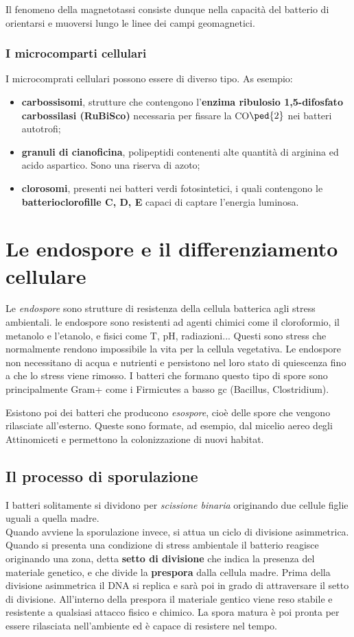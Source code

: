 \documentclass[11pt]{book}
\begin{document}
Il fenomeno della magnetotassi consiste dunque nella capacità del batterio di orientarsi e muoversi lungo le linee dei campi geomagnetici. 


\subsection{I microcomparti cellulari}
I microcomprati cellulari possono essere di diverso tipo. As esempio:
\begin{itemize}
\item \textbf{carbossisomi}, strutture che contengono l’\textbf{enzima ribulosio 1,5-difosfato carbossilasi (RuBiSco)} necessaria per fissare la CO$\ped{2}$ nei batteri autotrofi;
\item \textbf{granuli di cianoficina}, polipeptidi contenenti alte quantità di arginina ed acido aspartico. Sono una riserva di azoto;
\item \textbf{clorosomi}, presenti nei batteri verdi fotosintetici, i quali contengono le \textbf{batterioclorofille C, D, E} capaci di captare l’energia luminosa.
\end{itemize}

\clearpage
\chapter{Le endospore e il differenziamento cellulare}
Le \emph{endospore} sono strutture di resistenza della cellula batterica agli stress ambientali. le endospore sono resistenti ad agenti chimici come il cloroformio, il metanolo e l'etanolo, e fisici come T, pH, radiazioni...
Questi sono stress che normalmente rendono impossibile la vita per la cellula vegetativa. Le endospore non necessitano di acqua e nutrienti e persistono nel loro stato di quiescenza fino a che lo stress viene rimosso. I batteri che formano questo tipo di spore sono principalmente Gram+ come i Firmicutes a basso gc (Bacillus, Clostridium).

Esistono poi dei batteri che producono \emph{esospore}, cioè delle spore che vengono rilasciate all'esterno. Queste sono formate, ad esempio, dal micelio aereo degli Attinomiceti e permettono la colonizzazione di nuovi habitat.



\section{Il processo di sporulazione}
I batteri solitamente si dividono per \emph{scissione binaria} originando due cellule figlie uguali a quella madre.\\
Quando avviene la sporulazione invece, si attua un ciclo di divisione asimmetrica.
Quando si presenta una condizione di stress ambientale il batterio reagisce originando una zona, detta \textbf{setto di divisione} che indica la presenza del materiale genetico, e che divide la \textbf{prespora} dalla cellula madre. Prima della divisione asimmetrica il DNA si replica e sarà poi in grado di attraversare il setto di divisione.
All'interno della prespora il materiale gentico viene reso stabile e resistente a qualsiasi attacco fisico e chimico. La spora matura è poi pronta per essere rilasciata nell'ambiente ed è capace di resistere nel tempo.
\end{document}
